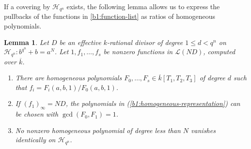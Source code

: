 \documentclass[12pt,reqno]{amsart}
\numberwithin{equation}{section}
\theoremstyle{plain}
\newtheorem{lemma}[theorem]{Lemma}
\theoremstyle{definition}
\theoremstyle{remark}
\begin{document}
If a covering by \(\mathcal H_{q^n}\) exists, the following lemma
allows us to express the pullbacks of the functions in
\eqref{b1:function-list} as ratios of homogeneous polynomials.

\begin{lemma}
\label{b1:polynomial-representation}
Let \(D\) be an effective \(k\)-rational divisor of degree
\(1\le d<q^n\) on \(\mathcal H_{q^n}:b^{q^n}+b=a^N\).
Let \(1,f_1,\ldots,f_s\) be nonzero functions in
\(\mathcal L(ND)\), computed over \(\overline{k}\).
\begin{enumerate}
\item\label{b1:homogeneous-representation}
There are homogeneous polynomials
\(F_0,\ldots,F_s\in\overline{k}[T_1,T_2,T_3]\) of degree \(d\)
such that
\(f_i=F_i(a,b,1)/F_0(a,b,1)\).
\item\label{b1:coprime-representation}
If \((f_1)_\infty=ND\), the polynomials in
\textup{(\ref{b1:homogeneous-representation})} can be chosen with
\(\gcd(F_0,F_1)=1\).
\item\label{b1:low-degree-nonvanishing}
No nonzero homogeneous polynomial of degree less than \(N\)
vanishes identically on \(\mathcal H_{q^n}\).
\end{enumerate}
\end{lemma}
\end{document}
